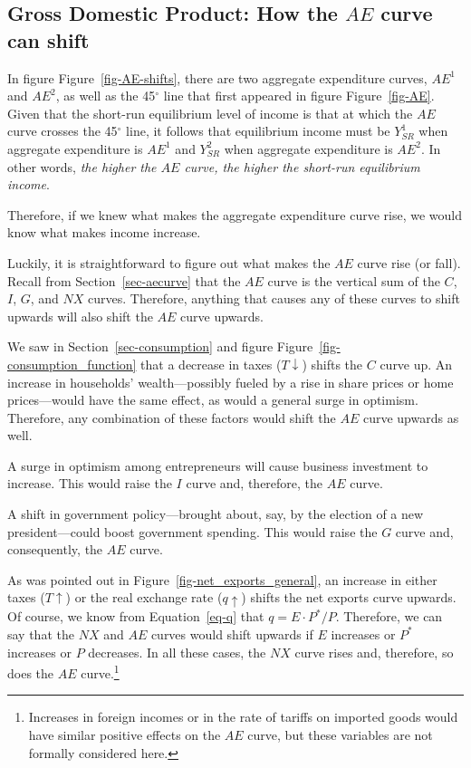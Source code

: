 \documentclass[
  letterpaper,
]{book}
\theoremstyle{plain}
\theoremstyle{remark}
\begin{document}
\subsection{\texorpdfstring{Gross Domestic Product: How the \(AE\) curve
can
shift}{Gross Domestic Product: How the AE curve can shift}}\label{sec-AE-shifts}


In figure Figure~\ref{fig-AE-shifts}, there are two aggregate
expenditure curves, \(AE^1\) and \(AE^2\), as well as the 45\(^{\circ}\)
line that first appeared in figure Figure~\ref{fig-AE}. Given that the
short-run equilibrium level of income is that at which the \(AE\) curve
crosses the 45\(^{\circ}\) line, it follows that equilibrium income must
be \(Y_{SR}^1\) when aggregate expenditure is \(AE^1\) and \(Y_{SR}^2\)
when aggregate expenditure is \(AE^2\). In other words, \emph{the higher
the \(AE\) curve, the higher the short-run equilibrium income}.

Therefore, if we knew what makes the aggregate expenditure curve rise,
we would know what makes income increase.

Luckily, it is straightforward to figure out what makes the \(AE\) curve
rise (or fall). Recall from Section~\ref{sec-aecurve} that the \(AE\)
curve is the vertical sum of the \(C\), \(I\), \(G\), and \(NX\) curves.
Therefore, anything that causes any of these curves to shift upwards
will also shift the \(AE\) curve upwards.

We saw in Section~\ref{sec-consumption} and figure
Figure~\ref{fig-consumption_function} that a decrease in taxes
(\(T\downarrow\)) shifts the \(C\) curve up. An increase in households'
wealth---possibly fueled by a rise in share prices or home
prices---would have the same effect, as would a general surge in
optimism. Therefore, any combination of these factors would shift the
\(AE\) curve upwards as well.

A surge in optimism among entrepreneurs will cause business investment
to increase. This would raise the \(I\) curve and, therefore, the \(AE\)
curve.

A shift in government policy---brought about, say, by the election of a
new president---could boost government spending. This would raise the
\(G\) curve and, consequently, the \(AE\) curve.

As was pointed out in Figure~\ref{fig-net_exports_general}, an increase
in either taxes (\(T\uparrow\)) or the real exchange rate
(\(q\uparrow\)) shifts the net exports curve upwards. Of course, we know
from Equation~\ref{eq-q} that \(q=E\cdot P^*/P\). Therefore, we can say
that the \(NX\) and \(AE\) curves would shift upwards if \(E\) increases
or \(P^*\) increases or \(P\) decreases. In all these cases, the \(NX\)
curve rises and, therefore, so does the \(AE\) curve.\footnote{Increases
  in foreign incomes or in the rate of tariffs on imported goods would
  have similar positive effects on the \(AE\) curve, but these variables
  are not formally considered here.}
\end{document}

